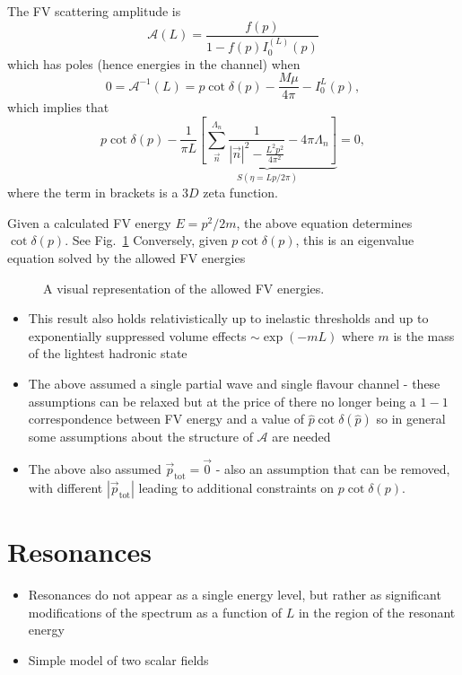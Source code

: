 The FV scattering amplitude is
\begin{equation}
    \mathcal{A}(L) = \frac{f(p)}{1 - f(p)I_0^{(L)}(p)}
\end{equation}
which has poles (hence energies in the channel) when
\begin{equation}
    0 = \mathcal{A}^{-1}(L) = p \cot \delta(p) - \frac{M \mu}{4 \pi} - I_0^{L}(p),
\end{equation}
which implies that
\begin{equation}
\label{eq:fv_energies}
    p \cot \delta(p) - \frac{1}{\pi L}\underset{S\left(\eta=Lp/2\pi\right)}{\underbrace{\left[\sum_{\vec{n}}^{\Lambda_n} \frac{1}{|\vec{n}|^2 - \frac{L^2 p^2}{4 \pi^2}} -4 \pi \Lambda_n\right]}} = 0,
\end{equation}
where the term in brackets is a $3D$ zeta function.

Given a calculated FV energy $E = p^2/2m$, the above equation determines $\cot \delta(p)$. See Fig.~\ref{fig:Sfunc}
%
Conversely, given $p \cot \delta(p)$, this is an eigenvalue equation solved by the allowed FV energies
\begin{figure}
\caption{A visual representation of the allowed FV energies.
\label{fig:Sfunc}}
\end{figure}
\begin{itemize}
    \item This result also holds relativistically up to inelastic thresholds and up to exponentially suppressed volume effects $\sim \exp(-m L)$ where $m$ is the mass of the lightest hadronic state
    \item The above assumed a single partial wave and single flavour channel - these assumptions can be relaxed but at the price of there no longer being a $1-1$ correspondence between FV energy and a value of $\hat{p}\cot \delta(\hat{p})$ so in general some assumptions about the structure of $\mathcal{A}$ are needed
    \item The above also assumed $\vec{p}_{\text{tot}} = \vec{0}$ - also an assumption that can be removed, with different $|\vec{p}_{\text{tot}}|$ leading to additional constraints on $p \cot \delta(p)$.
\end{itemize}
\section{Resonances}
\begin{itemize}
    \item Resonances do not appear as a single energy level, but rather as significant modifications of the spectrum as a function of $L$ in the region of the resonant energy
    \item Simple model of two scalar fields
\end{itemize}

